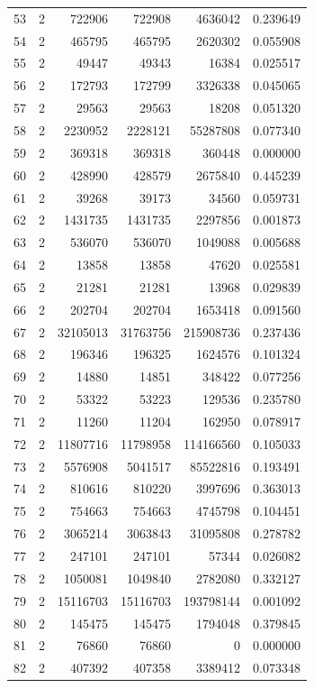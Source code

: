 \begin{longtable}{rrrrrr}
53 & 2 & 722906 & 722908 & 4636042 & 0.239649\\
54 & 2 & 465795 & 465795 & 2620302 & 0.055908\\
55 & 2 & 49447 & 49343 & 16384 & 0.025517\\
56 & 2 & 172793 & 172799 & 3326338 & 0.045065\\
57 & 2 & 29563 & 29563 & 18208 & 0.051320\\
58 & 2 & 2230952 & 2228121 & 55287808 & 0.077340\\
59 & 2 & 369318 & 369318 & 360448 & 0.000000\\
60 & 2 & 428990 & 428579 & 2675840 & 0.445239\\
61 & 2 & 39268 & 39173 & 34560 & 0.059731\\
62 & 2 & 1431735 & 1431735 & 2297856 & 0.001873\\
63 & 2 & 536070 & 536070 & 1049088 & 0.005688\\
64 & 2 & 13858 & 13858 & 47620 & 0.025581\\
65 & 2 & 21281 & 21281 & 13968 & 0.029839\\
66 & 2 & 202704 & 202704 & 1653418 & 0.091560\\
67 & 2 & 32105013 & 31763756 & 215908736 & 0.237436\\
68 & 2 & 196346 & 196325 & 1624576 & 0.101324\\
69 & 2 & 14880 & 14851 & 348422 & 0.077256\\
70 & 2 & 53322 & 53223 & 129536 & 0.235780\\
71 & 2 & 11260 & 11204 & 162950 & 0.078917\\
72 & 2 & 11807716 & 11798958 & 114166560 & 0.105033\\
73 & 2 & 5576908 & 5041517 & 85522816 & 0.193491\\
74 & 2 & 810616 & 810220 & 3997696 & 0.363013\\
75 & 2 & 754663 & 754663 & 4745798 & 0.104451\\
76 & 2 & 3065214 & 3063843 & 31095808 & 0.278782\\
77 & 2 & 247101 & 247101 & 57344 & 0.026082\\
78 & 2 & 1050081 & 1049840 & 2782080 & 0.332127\\
79 & 2 & 15116703 & 15116703 & 193798144 & 0.001092\\
80 & 2 & 145475 & 145475 & 1794048 & 0.379845\\
81 & 2 & 76860 & 76860 & 0 & 0.000000\\
82 & 2 & 407392 & 407358 & 3389412 & 0.073348\\

\end{longtable}
